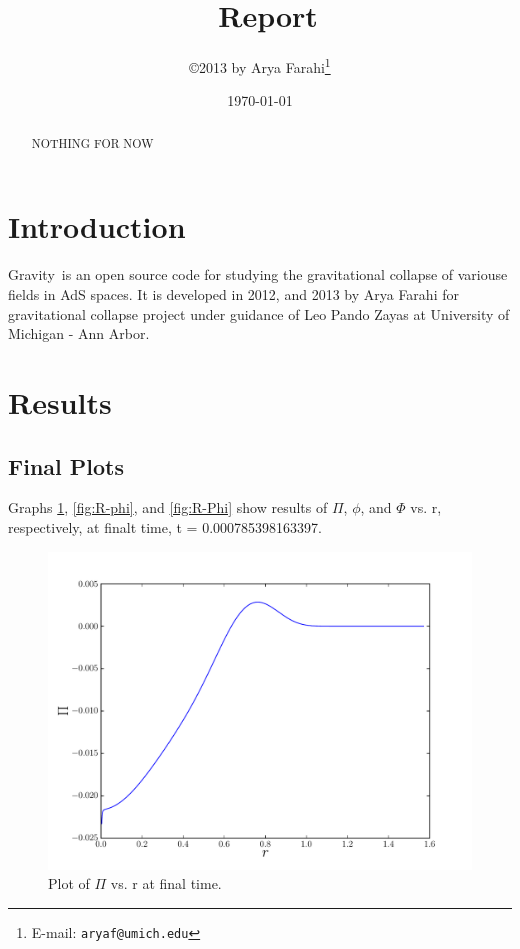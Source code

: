 \documentclass[12pt]{article}
\title{\grv\ Report}
\author{\copyright 2013 by Arya Farahi\thanks{E-mail: {\tt aryaf@umich.edu}}}
\date{\today}
\def\grv{{\sc Gravity}}
\begin{document}
\maketitle

\begin{abstract}
NOTHING FOR NOW
\end{abstract}


\section{Introduction}

\grv\ is an open source code for studying the gravitational collapse of variouse fields in AdS spaces. It is developed in 2012, and 2013 by Arya Farahi for gravitational collapse project under guidance of Leo Pando Zayas at University of Michigan - Ann Arbor. 
\section{Results}
\subsection{Final Plots}

Graphs \ref{fig:R-Pi}, \ref{fig:R-phi}, and \ref{fig:R-Phi} show results of $\Pi$, $\phi$, and $\Phi$ vs. r, respectively, at finalt time, t =  0.000785398163397.

\begin{figure}[hbt]
 \centering
 \includegraphics[width=12cm]{./Report/PivrR.pdf}
 \caption{Plot of $\Pi$ vs. r at final time.}
 \label{fig:R-Pi}
\end{figure}
\end{document}
